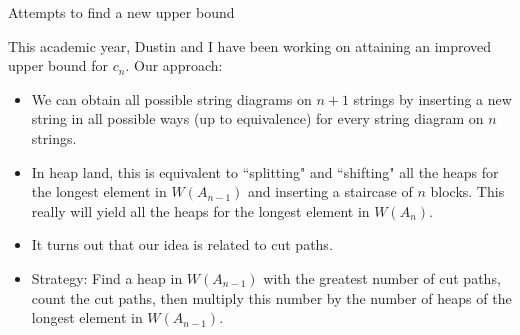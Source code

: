 \documentclass[10pt, compress,aspectratio=169,handout]{beamer}
\begin{document}

\begin{frame}{Attempts to find a new upper bound}\pause

\vspace{1em}

This academic year, Dustin and I have been working on attaining an improved upper bound for $c_n$.  Our approach:

\pause

\vspace{-.5em}

\begin{itemize}
\item We can obtain all possible string diagrams on $n+1$ strings by inserting a new string in all possible ways (up to equivalence) for every string diagram on $n$ strings. \pause
\item In heap land, this is equivalent to ``splitting" and ``shifting" all the heaps for the longest element in $W(A_{n-1})$ and inserting a staircase of $n$ blocks. This really will yield all the heaps for the longest element in $W(A_n)$. \pause
\item It turns out that our idea is related to \alert{cut paths}. \pause
\item Strategy: Find a heap in $W(A_{n-1})$ with the greatest number of cut paths, count the cut paths, then multiply this number by the number of heaps of the longest element in $W(A_{n-1})$.
\end{itemize}

\end{frame}

\end{document}
